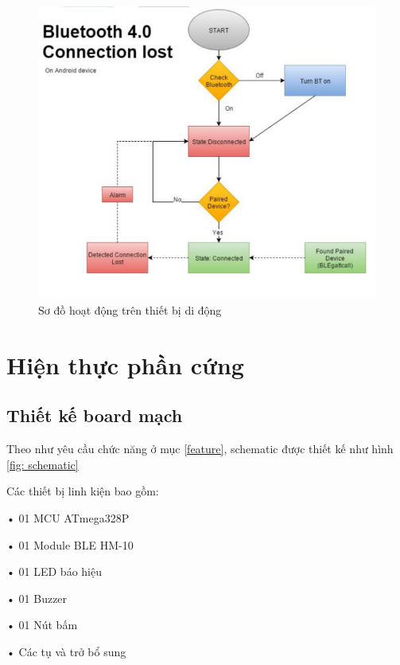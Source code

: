	\begin{figure}[h]
		\centering    
		\includegraphics[width=1.0\textwidth]{blelost}
		\caption[Sơ đồ hoạt động trên thiết bị di động]{Sơ đồ hoạt động trên thiết bị di động}
		\label{fig: blelost}
	\end{figure}
\newpage
\section{Hiện thực phần cứng}
\subsection{Thiết kế board mạch}
Theo như yêu cầu chức năng ở mục \ref{feature}, schematic được thiết kế như hình \ref{fig: schematic}

Các thiết bị linh kiện bao gồm:

• 01 MCU ATmega328P

• 01 Module BLE HM-10

• 01 LED báo hiệu

• 01 Buzzer

• 01 Nút bấm

• Các tụ và trở bổ sung

